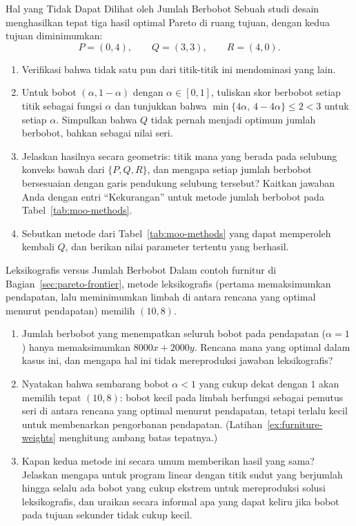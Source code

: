 
\begin{ex}{Hal yang Tidak Dapat Dilihat oleh Jumlah Berbobot}{}
\label{ex:nonconvex-weights}
Sebuah studi desain menghasilkan tepat tiga hasil optimal Pareto di ruang tujuan, dengan kedua tujuan diminimumkan:
\[
P = (0, 4), \qquad Q = (3, 3), \qquad R = (4, 0).
\]
\begin{enumerate}
\item Verifikasi bahwa tidak satu pun dari titik-titik ini mendominasi yang lain.
\item Untuk bobot $(\alpha, 1-\alpha)$ dengan $\alpha \in [0,1]$, tuliskan skor berbobot setiap titik sebagai fungsi $\alpha$ dan tunjukkan bahwa $\min\{4\alpha,\, 4 - 4\alpha\} \leq 2 < 3$ untuk setiap $\alpha$. Simpulkan bahwa $Q$ tidak pernah menjadi optimum jumlah berbobot, bahkan sebagai nilai seri.
\item Jelaskan hasilnya secara geometris: titik mana yang berada pada selubung konveks bawah dari $\{P, Q, R\}$, dan mengapa setiap jumlah berbobot bersesuaian dengan garis pendukung selubung tersebut? Kaitkan jawaban Anda dengan entri ``Kekurangan'' untuk metode jumlah berbobot pada Tabel~\ref{tab:moo-methods}.
\item Sebutkan metode dari Tabel~\ref{tab:moo-methods} yang dapat memperoleh kembali $Q$, dan berikan nilai parameter tertentu yang berhasil.
\end{enumerate}
\end{ex}

\begin{ex}{Leksikografis versus Jumlah Berbobot}{}
\label{ex:lex-vs-weighted}
Dalam contoh furnitur di Bagian~\ref{sec:pareto-frontier}, metode leksikografis (pertama memaksimumkan pendapatan, lalu meminimumkan limbah di antara rencana yang optimal menurut pendapatan) memilih $(10, 8)$.
\begin{enumerate}
\item Jumlah berbobot yang menempatkan seluruh bobot pada pendapatan ($\alpha = 1$) hanya memaksimumkan $8000x + 2000y$. Rencana mana yang optimal dalam kasus ini, dan mengapa hal ini tidak mereproduksi jawaban leksikografis?
\item Nyatakan bahwa sembarang bobot $\alpha < 1$ yang cukup dekat dengan $1$ akan memilih tepat $(10, 8)$: bobot kecil pada limbah berfungsi sebagai pemutus seri di antara rencana yang optimal menurut pendapatan, tetapi terlalu kecil untuk membenarkan pengorbanan pendapatan. (Latihan~\ref{ex:furniture-weights} menghitung ambang batas tepatnya.)
\item Kapan kedua metode ini secara umum memberikan hasil yang sama? Jelaskan mengapa untuk program linear dengan titik sudut yang berjumlah hingga selalu ada bobot yang cukup ekstrem untuk mereproduksi solusi leksikografis, dan uraikan secara informal apa yang dapat keliru jika bobot pada tujuan sekunder tidak cukup kecil.
\end{enumerate}
\end{ex}


